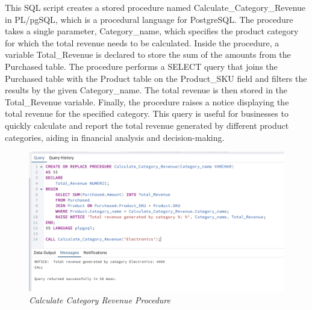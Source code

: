 

This SQL script creates a stored procedure named Calculate\_Category\_Revenue in PL/pgSQL, which is a procedural language for PostgreSQL. The procedure takes a single parameter, Category\_name, which specifies the product category for which the total revenue needs to be calculated. Inside the procedure, a variable Total\_Revenue is declared to store the sum of the amounts from the Purchased table. The procedure performs a SELECT query that joins the Purchased table with the Product table on the Product\_SKU field and filters the results by the given Category\_name. The total revenue is then stored in the Total\_Revenue variable. Finally, the procedure raises a notice displaying the total revenue for the specified category. This query is useful for businesses to quickly calculate and report the total revenue generated by different product categories, aiding in financial analysis and decision-making.

\begin{figure}[H]
  \centering
  \includegraphics[width=1\textwidth]{images/sql/stored-procedures/calculate_category_revenue.png}
  \caption{\textit{Calculate Category Revenue Procedure}}
\end{figure}
